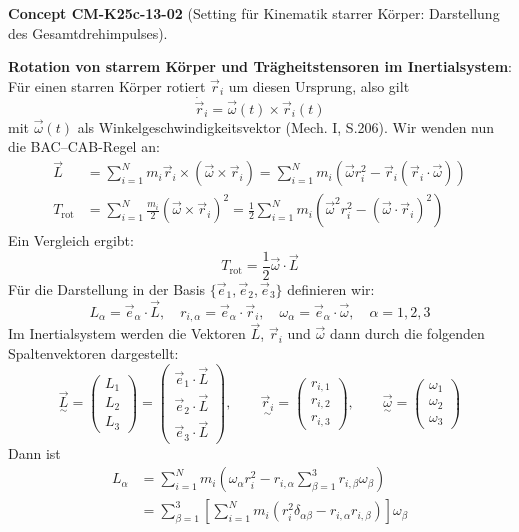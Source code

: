 \documentclass[10pt, letterpaper]{article}
\newcommand{\CustomHeading}[3]{%
  \par\medskip\noindent%
  \textbf{#1 #2} \textnormal{(#3)}.\enskip%
}
\newenvironment{CONC}[2]{\CustomHeading{Concept}{#1}{#2}}{}
\begin{document}
\begin{CONC}{CM-K25c-13-02}{Setting für Kinematik starrer Körper: Darstellung des Gesamtdrehimpulses}
\textbf{Rotation von starrem Körper und Trägheitstensoren im Inertialsystem}: Für einen starren Körper rotiert $\vec{r}_i$ um diesen Ursprung, also gilt
\[
\dot{\vec{r}}_i = \vec{\omega}(t) \times \vec{r}_i(t)
\]
mit $\vec{\omega}(t)$ als Winkelgeschwindigkeitsvektor (Mech. I, S.206). Wir wenden nun die BAC–CAB-Regel an:
\[
\begin{aligned}
\vec{L} &= \sum_{i=1}^N m_i \vec{r}_i \times (\vec{\omega} \times \vec{r}_i)
= \sum_{i=1}^N m_i \left( \vec{\omega} r_i^2 - \vec{r}_i (\vec{r}_i \cdot \vec{\omega}) \right) \\
T_{\text{rot}} &= \sum_{i=1}^N \frac{m_i}{2} (\vec{\omega} \times \vec{r}_i)^2
= \frac{1}{2} \sum_{i=1}^N m_i \left( \vec{\omega}^2 r_i^2 - (\vec{\omega} \cdot \vec{r}_i)^2 \right)
\end{aligned}
\]
Ein Vergleich ergibt:
\[
\boxed{T_{\text{rot}} = \frac{1}{2} \vec{\omega} \cdot \vec{L}}
\]
Für die Darstellung in der Basis $\{ \vec{e}_1, \vec{e}_2, \vec{e}_3 \}$ definieren wir:
\[
L_\alpha = \vec{e}_\alpha \cdot \vec{L}, \quad r_{i,\alpha} = \vec{e}_\alpha \cdot \vec{r}_i, \quad \omega_\alpha = \vec{e}_\alpha \cdot \vec{\omega}, \quad \alpha = 1,2,3
\]
Im Inertialsystem werden die Vektoren $\vec{L}$, $\vec{r}_i$ und $\vec{\omega}$ dann durch die folgenden Spaltenvektoren dargestellt:
\[
\underset{\sim}{\vec{L}} =
\begin{pmatrix}
L_1 \\
L_2 \\
L_3
\end{pmatrix}
=
\begin{pmatrix}
\vec{e}_1 \cdot \vec{L} \\
\vec{e}_2 \cdot \vec{L} \\
\vec{e}_3 \cdot \vec{L}
\end{pmatrix}, \qquad
\underset{\sim}{\vec{r}_i} =
\begin{pmatrix}
r_{i,1} \\
r_{i,2} \\
r_{i,3}
\end{pmatrix}, \qquad
\underset{\sim}{\vec{\omega}} =
\begin{pmatrix}
\omega_1 \\
\omega_2 \\
\omega_3
\end{pmatrix}
\]
Dann ist
\[
\begin{aligned}
L_\alpha &= \sum_{i=1}^N m_i \left( \omega_\alpha r_i^2 - r_{i,\alpha} \sum_{\beta=1}^3 r_{i,\beta} \omega_\beta \right) \\
&= \sum_{\beta=1}^3 \left[ \sum_{i=1}^N m_i \left( r_i^2 \delta_{\alpha\beta} - r_{i,\alpha} r_{i,\beta} \right) \right] \omega_\beta

\end{aligned}\]
\end{CONC}
\end{document}
